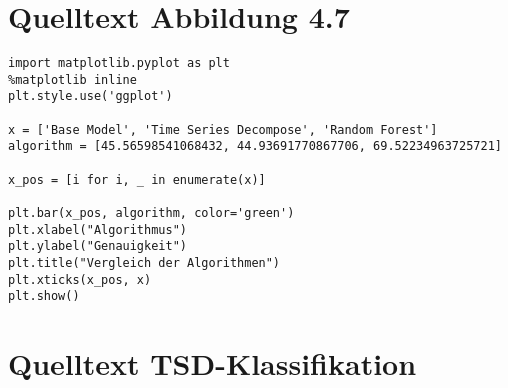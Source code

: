 \section{Quelltext Abbildung 4.7}

\begin{lstlisting}[caption={\texttt{Quelltext Abbildung 4.7}},captionpos=b]
import matplotlib.pyplot as plt
%matplotlib inline
plt.style.use('ggplot')

x = ['Base Model', 'Time Series Decompose', 'Random Forest']
algorithm = [45.56598541068432, 44.93691770867706, 69.52234963725721]

x_pos = [i for i, _ in enumerate(x)]

plt.bar(x_pos, algorithm, color='green')
plt.xlabel("Algorithmus")
plt.ylabel("Genauigkeit")
plt.title("Vergleich der Algorithmen")
plt.xticks(x_pos, x)
plt.show()
\end{lstlisting}

\section{Quelltext TSD-Klassifikation}

